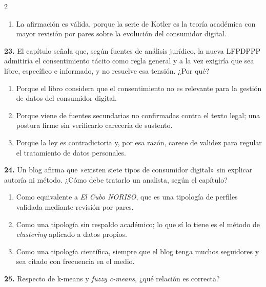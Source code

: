 \documentclass[10pt,letterpaper]{article}
\begin{document}
\begin{multicols}{2}
\begin{enumerate}[label=\alph*),leftmargin=1.1em,itemsep=0pt,topsep=1pt,parsep=0pt,partopsep=0pt]
\item La afirmación es válida, porque la serie de Kotler es la teoría académica con mayor revisión por pares sobre la evolución del consumidor digital.
\end{enumerate}
\vspace{2pt}
\noindent\textbf{23.} El capítulo señala que, según fuentes de análisis jurídico, la nueva LFPDPPP admitiría el consentimiento tácito como regla general y a la vez exigiría que sea libre, específico e informado, y no resuelve esa tensión. ¿Por qué?
\vspace{-3pt}
\begin{enumerate}[label=\alph*),leftmargin=1.1em,itemsep=0pt,topsep=1pt,parsep=0pt,partopsep=0pt]
\item Porque el libro considera que el consentimiento no es relevante para la gestión de datos del consumidor digital.
\item Porque viene de fuentes secundarias no confirmadas contra el texto legal; una postura firme sin verificarlo carecería de sustento.
\item Porque la ley es contradictoria y, por esa razón, carece de validez para regular el tratamiento de datos personales.
\end{enumerate}
\vspace{2pt}
\noindent\textbf{24.} Un blog afirma que «existen siete tipos de consumidor digital» sin explicar autoría ni método. ¿Cómo debe tratarlo un analista, según el capítulo?
\vspace{-3pt}
\begin{enumerate}[label=\alph*),leftmargin=1.1em,itemsep=0pt,topsep=1pt,parsep=0pt,partopsep=0pt]
\item Como equivalente a \textit{El Cubo NORISO}, que es una tipología de perfiles validada mediante revisión por pares.
\item Como una tipología sin respaldo académico; lo que sí lo tiene es el método de \textit{clustering} aplicado a datos propios.
\item Como una tipología científica, siempre que el blog tenga muchos seguidores y sea citado con frecuencia en el medio.
\end{enumerate}
\vspace{2pt}
\noindent\textbf{25.} Respecto de k-means y \textit{fuzzy c-means}, ¿qué relación es correcta?
\vspace{-3pt}
\begin{enumerate}[label=\alph*),leftmargin=1.1em,itemsep=0pt,topsep=1pt,parsep=0pt,partopsep=0pt]

\end{enumerate}
\end{multicols}
\end{document}
